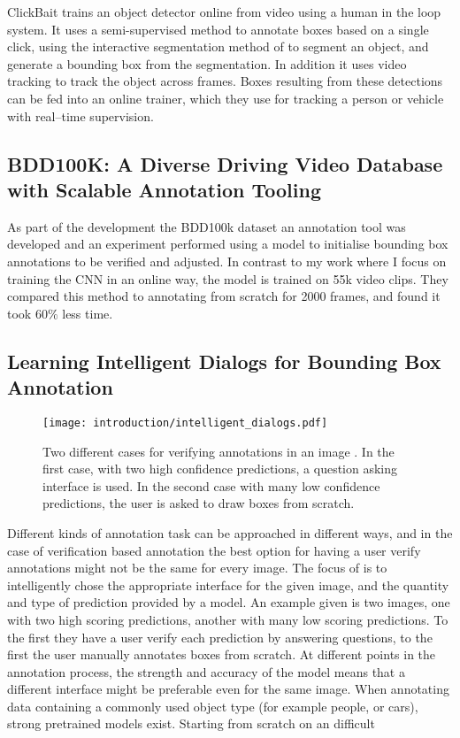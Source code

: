 ClickBait trains an object detector online from video using a human in the loop system. It uses a semi-supervised method to annotate boxes based on a single click, using the interactive segmentation method of \cite{Xu2016} to segment an object, and generate a bounding box from the segmentation. In addition it uses video tracking to track the object across frames. Boxes resulting from these detections can be fed into an online trainer, which they use for tracking a person or vehicle with real--time supervision.


\subsection{BDD100K: A Diverse Driving Video Database with
Scalable Annotation Tooling \cite{Yu2018a}}

As part of the development the BDD100k dataset an annotation tool was developed and an experiment performed using a model to initialise bounding box annotations to be verified and adjusted. In contrast to my work where I focus on training the \gls{CNN} in an online way, the model is trained on 55k video clips. They compared this method to annotating from scratch for 2000 frames, and found it took $60\%$ less time.

\subsection{Learning Intelligent Dialogs for Bounding Box Annotation}

\begin{figure}[h]
  \centering
  \texttt{[image: introduction/intelligent\_dialogs.pdf]}
  \caption{Two different cases for verifying annotations in an image \cite{Konyushkova2017}. In the first case, with two high confidence predictions, a question asking interface is used. In the second case with many low confidence predictions, the user is asked to draw boxes from scratch. }
  \label{fig:intelligent_dialogs}
\end{figure}

Different kinds of annotation task can be approached in different ways, and in the case of verification based annotation the best option for having a user verify annotations might not be the same for every image. The focus of \cite{Konyushkova2017} is to intelligently chose the appropriate interface for the given image, and the quantity and type of prediction provided by a model. An example given is two images, one with two high scoring predictions, another with many low scoring predictions. To the first they have a user  verify each prediction by answering questions, to the first the user manually annotates boxes from scratch. At different points in the annotation process, the strength and accuracy of the model means that a different interface might be preferable even for the same image. When annotating data containing a commonly used object type (for example people, or cars), strong pretrained models exist. Starting from scratch on an difficult 


